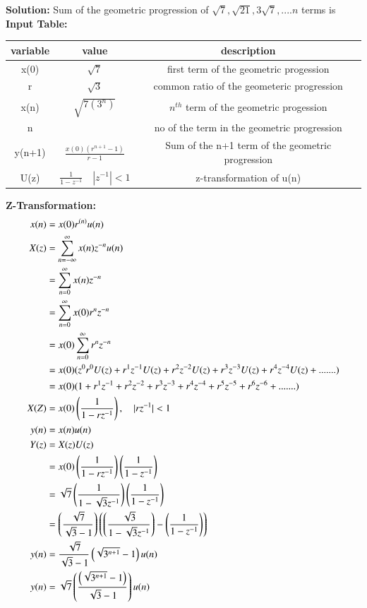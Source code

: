 \documentclass[a4,12pt,onecolumn]{IEEEtran}
\begin{document}
\textbf{Solution:}
 Sum of the geometric progression of $\sqrt{7}, \sqrt{21}, 3\sqrt{7},....n$ terms is\\
 \textbf{Input Table:}
 \begin{center}
\begin{tabular}{|c|c|c|}
   \hline
   variable&value&description  \\
   \hline
   x(0) & $ \sqrt{7} $& first term of the geometric progession\\
   \hline
   r & $\sqrt{3}$ & common ratio of the geometeric progression\\
   \hline
   x(n) & $\sqrt{7(3^{n})}$& $n^{th}$ term of the geometric progession\\
   \hline
   n& &no of the term in the geometric progression\\
   \hline
   y(n+1) &$\frac{x(0)(r^{n+1}-1)}{r-1}$ &Sum of the n+1 term of the geometric progression\\
   \hline 
   U(z)&$\frac{1}{1-z^{-1}} \quad{|z^{-1}|<1}$&z-transformation of u(n)\\
   \hline
\end{tabular}
\end{center}
\textbf{\large{Z-Transformation:}}
\begin{align}
   x(n) &= x(0)r^{(n)}u(n) \\
    X(z) &= \sum_{n=-\infty}^{\infty} x(n)z^{-n}u(n)\\
&=\sum_{n=0}^{\infty} x(n)z^{-n} \\
&=\sum_{n=0}^{\infty} x(0)r^nz^{-n} \\ 
&=x(0)\sum_{n=0}^{\infty} r^nz^{-n} \\ 
&=x(0)(z^0r^0U(z)+ r^1z^{-1}U(z)+r^2z^{-2}U(z)+r^3z^{-3}U(z)+r^4z^{-4}U(z)+.......)\\
&= x(0)(1+r^1z^{-1}+r^2z^{-2}+r^3z^{-3}+r^4z^{-4}+r^5z^{-5}+r^6z^{-6}+.......)\\
X(Z)&=x(0)\left(\frac{1}{1-rz^{-1}}\right),\quad{|rz^{-1}|<1}\\
y(n)&=x(n)u(n)\\
Y(z)&=X(z)U(z)\\
&=x(0)\left(\frac{1}{1-rz^{-1}}\right)\left(\frac{1}{1-z^{-1}}\right)\\
&=\sqrt{7}\left(\frac{1}{1-\sqrt{3}z^{-1}}\right)\left(\frac{1}{1-z^{-1}}\right)\\
&=\left(\frac{\sqrt{7}}{\sqrt{3}-1}\right)\left(\left(\frac{\sqrt{3}}{1-\sqrt{3}z^{-1}}\right)-\left(\frac{1}{1-z^{-1}}\right)\right)\\
y(n)&=\frac{\sqrt{7}}{\sqrt{3}-1}\left(\sqrt{3^{n+1}}-1\right)u(n)\\
y(n)&=\sqrt{7}\left(\frac{\left(\sqrt{3^{n+1}}-1\right)}{\sqrt{3}-1}\right)u(n)\end{align}
\end{document}

